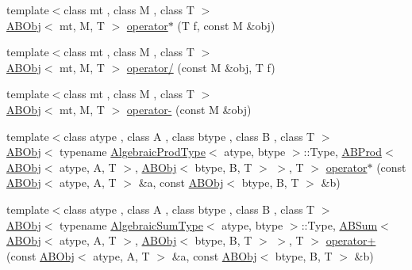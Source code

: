 \begin{DoxyCompactItemize}
\item 
{\footnotesize template$<$class mt , class M , class T $>$ }\\\mbox{\hyperlink{classROOT_1_1Minuit2_1_1ABObj}{A\+B\+Obj}}$<$ mt, M, T $>$ \mbox{\hyperlink{namespaceROOT_1_1Minuit2_a03054cc34855692b00d3dd16a0389195}{operator$\ast$}} (T f, const M \&obj)
\item 
{\footnotesize template$<$class mt , class M , class T $>$ }\\\mbox{\hyperlink{classROOT_1_1Minuit2_1_1ABObj}{A\+B\+Obj}}$<$ mt, M, T $>$ \mbox{\hyperlink{namespaceROOT_1_1Minuit2_acfd7451cf386a28e70ea5be0965f631a}{operator/}} (const M \&obj, T f)
\item 
{\footnotesize template$<$class mt , class M , class T $>$ }\\\mbox{\hyperlink{classROOT_1_1Minuit2_1_1ABObj}{A\+B\+Obj}}$<$ mt, M, T $>$ \mbox{\hyperlink{namespaceROOT_1_1Minuit2_a95351951cc1f33b0a2904a47adacd999}{operator-\/}} (const M \&obj)
\item 
{\footnotesize template$<$class atype , class A , class btype , class B , class T $>$ }\\\mbox{\hyperlink{classROOT_1_1Minuit2_1_1ABObj}{A\+B\+Obj}}$<$ typename \mbox{\hyperlink{classROOT_1_1Minuit2_1_1AlgebraicProdType}{Algebraic\+Prod\+Type}}$<$ atype, btype $>$\+::Type, \mbox{\hyperlink{classROOT_1_1Minuit2_1_1ABProd}{A\+B\+Prod}}$<$ \mbox{\hyperlink{classROOT_1_1Minuit2_1_1ABObj}{A\+B\+Obj}}$<$ atype, A, T $>$, \mbox{\hyperlink{classROOT_1_1Minuit2_1_1ABObj}{A\+B\+Obj}}$<$ btype, B, T $>$ $>$, T $>$ \mbox{\hyperlink{namespaceROOT_1_1Minuit2_a4f2bdc9b3267afa787ef956ac703f344}{operator$\ast$}} (const \mbox{\hyperlink{classROOT_1_1Minuit2_1_1ABObj}{A\+B\+Obj}}$<$ atype, A, T $>$ \&a, const \mbox{\hyperlink{classROOT_1_1Minuit2_1_1ABObj}{A\+B\+Obj}}$<$ btype, B, T $>$ \&b)
\item 
{\footnotesize template$<$class atype , class A , class btype , class B , class T $>$ }\\\mbox{\hyperlink{classROOT_1_1Minuit2_1_1ABObj}{A\+B\+Obj}}$<$ typename \mbox{\hyperlink{classROOT_1_1Minuit2_1_1AlgebraicSumType}{Algebraic\+Sum\+Type}}$<$ atype, btype $>$\+::Type, \mbox{\hyperlink{classROOT_1_1Minuit2_1_1ABSum}{A\+B\+Sum}}$<$ \mbox{\hyperlink{classROOT_1_1Minuit2_1_1ABObj}{A\+B\+Obj}}$<$ atype, A, T $>$, \mbox{\hyperlink{classROOT_1_1Minuit2_1_1ABObj}{A\+B\+Obj}}$<$ btype, B, T $>$ $>$, T $>$ \mbox{\hyperlink{namespaceROOT_1_1Minuit2_a0af705023d7183d8394e7b74563c9188}{operator+}} (const \mbox{\hyperlink{classROOT_1_1Minuit2_1_1ABObj}{A\+B\+Obj}}$<$ atype, A, T $>$ \&a, const \mbox{\hyperlink{classROOT_1_1Minuit2_1_1ABObj}{A\+B\+Obj}}$<$ btype, B, T $>$ \&b)

\end{DoxyCompactItemize}
